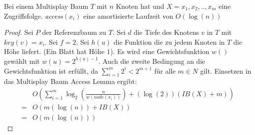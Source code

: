 \documentclass[a4paper,12pt]{article}
\begin{document}
\newtheorem{Satz2}{Satz}[section] 
\begin{Satz1}Bei einem Multisplay Baum $T$ mit $n$ Knoten hat und $X = x_1, x_2,.., x_m$ eine Zugriffsfolge. \textit{access}$\left(x_i\right)$ eine amortisierte Laufzeit von $O\left(\log\left(n\right)\right)$ 
\end{Satz1}
\begin{proof}
	
	Sei $P$ der Referenzbaum zu $T$. Sei $d$ die Tiefe des Knotens $v$ in $T$ mit $\mathit{key}\left(v\right) = x_i$. Sei $f = 2$. Sei $h\left(u\right)$ die Funktion die zu jedem Knoten in $T$ die Höhe liefert. (Ein Blatt hat Höhe $1$). Es wird eine Gewichtsfunktion $w\left(\right)$ gewählt mit  $w\left(u\right) = 2^{h\left(u\right)-1}$. Auch die zweite Bedingung an die Gewichtsfunktion ist erfüllt, da $\sum_{i = 1}^{m} 2^i < 2^{m+1}$ für alle $m \in \mathit{N}$ gilt. Einsetzen in das Multisplay Baum Access Lemma ergibt:
	\begin{align*}
	&O\left(  \sum_{i = 1}^{m} \log_2\left(   \frac{n}{w\left(\textit{node}\left(x_i\right)\right)}  \right)  
	+ \left(\log\left( 2\right)\right) \left(\mathit{IB}\left(X\right) + m\right) \right)\\
	=&O\left(m \left(\log\left(n\right) \right)+ \mathit{IB}\left(X\right) \right)\\
	=& O\left(m \left(\log\left(n\right)\right)\right)
	\end{align*}	
\end{proof}






\newpage


\end{document}
